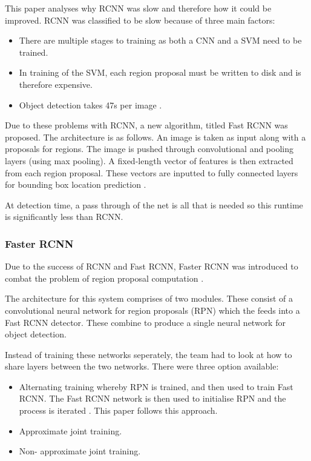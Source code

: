 This paper analyses why RCNN \textcite{rcnn} was slow and therefore how it could be improved.
RCNN was classified to be slow because of three main factors:
\begin{itemize}
	\item{There are multiple stages to training as both a CNN and a SVM need to
		be trained.}
	\item{In training of the SVM, each region proposal must be written to disk
		and is therefore expensive.}
	\item{Object detection takes 47s per image \textcite{fastRcnn}.}
\end{itemize}

Due to these problems with RCNN, a new algorithm, titled Fast RCNN was proposed.
The architecture is as follows. An image is taken as input along with a
proposals for regions. The image is pushed through convolutional and pooling
layers (using max pooling). A fixed-length vector of features is then extracted
from each region proposal. These vectors are inputted to fully connected
layers for bounding box location prediction \textcite{fastRcnn}.

At detection time, a pass through of the net is all that is needed so this
runtime is significantly less than RCNN.

\subsubsection{Faster RCNN}
Due to the success of RCNN and Fast RCNN, Faster RCNN was introduced to combat
the problem of region proposal computation \textcite{fasterRcnn}.

The architecture for this system comprises of two modules. These consist of a
convolutional neural network for region proposals (RPN) which the feeds into a Fast
RCNN detector. These combine to produce a single neural network for object
detection.

Instead of training these networks seperately, the team had to look at how to
share layers between the two networks. There were three option available:
\begin{itemize}
    \item{Alternating training whereby RPN is trained, and then used to train
        Fast RCNN. The Fast RCNN network is then used to initialise RPN and the
		process is iterated \textcite{fasterRcnn}. This paper follows this approach.}
    \item{Approximate joint training.}
    \item{Non- approximate joint training.}
\end{itemize}

